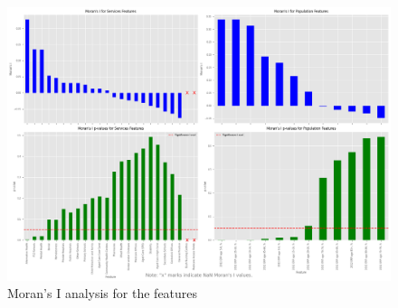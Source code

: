 \documentclass[
	a4paper, %
	10pt, %
	unnumberedsections, %
	twoside, %
]{LTJournalArticle}
\begin{document}
\begin{figure}
  \includegraphics[scale=0.5]{moran_i_analysis.png}
  \caption{Moran's I analysis for the features}
  \label{fig:moran_part_A}
\end{figure}



\pagebreak
\clearpage




\twocolumn
\printbibliography
\end{document}
